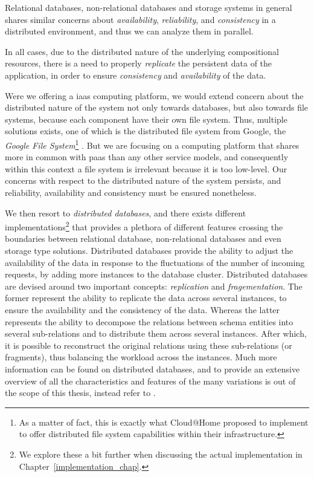 \documentclass[12pt, titlepage]{uo_temp}
\begin{document}
     Relational databases, non-relational databases and storage systems in general shares
     similar concerns about \emph{availability}, \emph{reliability}, and
     \emph{consistency} in a distributed environment, and thus we can analyze them in
     parallel.

     In all cases, due to the distributed nature of the underlying compositional
     resources, there is a need to properly \emph{replicate} the persistent data of the
     application, in order to ensure \emph{consistency} and \emph{availability} of the
     data.
     
     Were we offering a \gls{iaas} computing platform, we would extend concern about the
     distributed nature of the system not only towards databases, but also towards file
     systems, because each component have their own file system. Thus, multiple solutions
     exists, one of which is the distributed file system from Google, the \emph{Google
       File System}\footnote{As a matter of fact, this is exactly what Cloud@Home proposed
       to implement to offer distributed file system capabilities within their
       infrastructure.} \cite{gfs}. But we are focusing on a computing platform that
     shares more in common with \gls{paas} than any other service models, and consequently
     within this context a file system is irrelevant because it is too low-level. Our
     concerns with respect to the distributed nature of the system persists, and
     reliability, availability and consistency must be ensured nonetheless.
     
     We then resort to \emph{distributed databases}, and there exists different
     implementations\footnote{We explore these a bit further when discussing the actual
       implementation in Chapter~\ref{implementation_chap}.} that provides a plethora of
     different features crossing the boundaries between relational database,
     non-relational databases and even storage type solutions. Distributed databases
     provide the ability to adjust the availability of the data in response to the
     fluctuations of the number of incoming requests, by adding more instances to the
     database cluster. Distributed databases are devised around two important concepts:
     \emph{replication} and \emph{fragementation}. The former represent the ability to
     replicate the data across several instances, to ensure the availability and the
     consistency of the data. Whereas the latter represents the ability to decompose the
     relations between schema entities into several sub-relations and to distribute them
     across several instances. After which, it is possible to reconstruct the original
     relations using these sub-relations (or fragments), thus balancing the workload
     across the instances. Much more information can be found on distributed databases,
     and to provide an extensive overview of all the characteristics and features of the
     many variations is out of the scope of this thesis, instead refer to
     \cite{linders1976distributed} \cite{draffan1980distributed}
     \cite{ozsu2011principles}.
     
\end{document}

